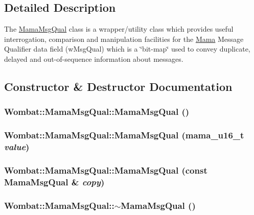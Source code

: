 \subsection{Detailed Description}
The \hyperlink{classWombat_1_1MamaMsgQual}{MamaMsgQual} class is a wrapper/utility class which provides useful interrogation, comparison and manipulation facilities for the \hyperlink{classWombat_1_1Mama}{Mama} Message Qualifier data field (wMsgQual) which is a \char`\"{}bit-\/map\char`\"{} used to convey duplicate, delayed and out-\/of-\/sequence information about messages. 

\subsection{Constructor \& Destructor Documentation}
\hypertarget{classWombat_1_1MamaMsgQual_add6d8160f22e2ae74b0c415e0fdf7649}{
\subsubsection[{MamaMsgQual}]{\setlength{\rightskip}{0pt plus 5cm}Wombat::MamaMsgQual::MamaMsgQual ()}}
\label{classWombat_1_1MamaMsgQual_add6d8160f22e2ae74b0c415e0fdf7649}
\hypertarget{classWombat_1_1MamaMsgQual_a6e15a296b1b0f4cbef6b94c9dcf752d6}{
\subsubsection[{MamaMsgQual}]{\setlength{\rightskip}{0pt plus 5cm}Wombat::MamaMsgQual::MamaMsgQual (mama\_\-u16\_\-t {\em value})}}
\label{classWombat_1_1MamaMsgQual_a6e15a296b1b0f4cbef6b94c9dcf752d6}
\hypertarget{classWombat_1_1MamaMsgQual_a204acf9fa97acdbef0098cb716fa0da0}{
\subsubsection[{MamaMsgQual}]{\setlength{\rightskip}{0pt plus 5cm}Wombat::MamaMsgQual::MamaMsgQual (const {\bf MamaMsgQual} \& {\em copy})}}
\label{classWombat_1_1MamaMsgQual_a204acf9fa97acdbef0098cb716fa0da0}
\hypertarget{classWombat_1_1MamaMsgQual_aa6518b71ae8d44fb30f7d2d2fb985df2}{
\subsubsection[{$\sim$MamaMsgQual}]{\setlength{\rightskip}{0pt plus 5cm}Wombat::MamaMsgQual::$\sim$MamaMsgQual ()}}
\label{classWombat_1_1MamaMsgQual_aa6518b71ae8d44fb30f7d2d2fb985df2}


